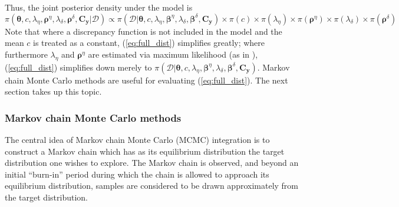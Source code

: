 \documentclass{article}
\begin{document}
Thus, the joint posterior density under the model is
\begin{equation} \label{eq:full_dist}
\pi(\boldsymbol \theta,c,\lambda_\eta,\boldsymbol \rho^\eta,\lambda_\delta,\boldsymbol \rho^\delta,\mathbf C_{\mathbf y}|\mathcal D)
\propto \pi(\mathcal D | \boldsymbol \theta,c,\lambda_\eta, \boldsymbol \beta^\eta,\lambda_\delta,\boldsymbol \beta^\delta,\mathbf C_{\mathbf y}) \times \pi(c) \times \pi(\lambda_\eta) \times 
\pi(\boldsymbol \rho^\eta) \times \pi(\lambda_\delta) \times \pi(\boldsymbol \rho^\delta)
\end{equation}
Note that where a discrepancy function is not included in the model and the mean $c$ is treated as a constant, (\ref{eq:full_dist}) simplifies greatly; where furthermore $\lambda_\eta$ and $\boldsymbol \rho^\eta$ are estimated via maximum likelihood (as in  \cite{Kennedy2001}),  (\ref{eq:full_dist}) simplifies down merely to 
$\pi(\mathcal D | \boldsymbol \theta,c,\lambda_\eta, \boldsymbol \beta^\eta,\lambda_\delta,\boldsymbol \beta^\delta,\mathbf C_{\mathbf y})$. Markov chain Monte Carlo methods are useful for evaluating (\ref{eq:full_dist}). The next section takes up this topic.

\subsubsection{Markov chain Monte Carlo methods}\label{MCMC_methods}


The central idea of Markov chain Monte Carlo (MCMC) integration is to construct a Markov chain which has as its equilibrium distribution the target distribution one wishes to explore. The Markov chain is observed, and beyond an initial ``burn-in'' period during which the chain is allowed to approach its equilibrium distribution, samples are considered to be drawn approximately from the target distribution.
\end{document}
